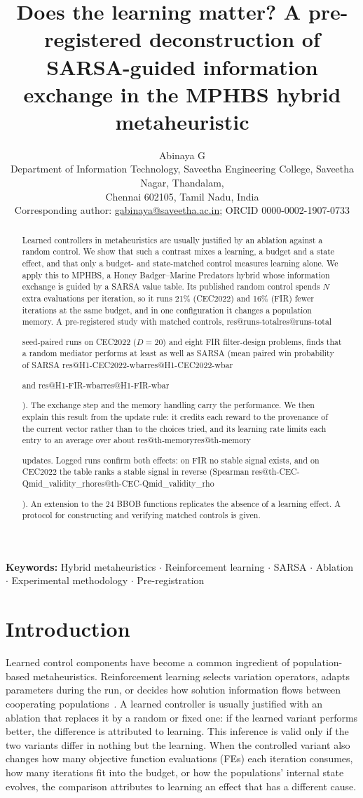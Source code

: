\documentclass[11pt]{article}
\title{Does the learning matter? A pre-registered deconstruction of SARSA-guided information exchange in the MPHBS hybrid metaheuristic}
\author{Abinaya G\\[2pt]
{\small Department of Information Technology, Saveetha Engineering College, Saveetha Nagar, Thandalam,}\\
{\small Chennai 602105, Tamil Nadu, India}\\
{\small Corresponding author: \url{gabinaya@saveetha.ac.in}; ORCID 0000-0002-1907-0733}}
\date{}
\makeatletter
\theoremstyle{definition}
\theoremstyle{remark}
\renewcommand\res[1]{\ifcsname res@#1\endcsname\csname res@#1\endcsname\else\PackageError{res}{Undefined result key #1}{}\fi}
\makeatother
\begin{document}
\maketitle

\begin{abstract}
Learned controllers in metaheuristics are usually justified by an ablation against a random control. We show that
such a contrast mixes a learning, a budget and a state effect, and that only a budget- and state-matched control
measures learning alone. We apply this to MPHBS, a Honey Badger--Marine Predators hybrid whose information exchange is
guided by a SARSA value table. Its published random control spends $N$ extra evaluations per iteration, so it runs 21\%
(CEC2022) and 16\% (FIR) fewer iterations at the same budget, and in one configuration it changes a population memory.
A pre-registered study with matched controls, \res{runs-total} seed-paired runs on CEC2022 ($D=20$) and eight FIR
filter-design problems, finds that a random mediator performs at least as well as SARSA (mean paired win probability of
SARSA \res{H1-CEC2022-wbar} and \res{H1-FIR-wbar}). The exchange step and the memory handling carry the performance. We
then explain this result from the update rule: it credits each reward to the provenance of the current
vector rather than to the choices tried, and its learning rate limits each entry to an average over about
\res{th-memory} updates. Logged runs confirm both effects: on FIR no stable signal exists, and on CEC2022 the table ranks
a stable signal in reverse (Spearman \res{th-CEC-Qmid_validity_rho}). An extension to the 24 BBOB functions replicates
the absence of a learning effect. A protocol for constructing and verifying matched controls is given.
\end{abstract}

\medskip
\noindent\textbf{Keywords:} Hybrid metaheuristics $\cdot$ Reinforcement learning $\cdot$ SARSA $\cdot$ Ablation $\cdot$ Experimental methodology $\cdot$ Pre-registration


\section{Introduction}
\label{sec:intro}

Learned control components have become a common ingredient of population-based metaheuristics. Reinforcement learning
selects variation operators, adapts parameters during the run, or decides how solution information flows between
cooperating populations~\citep{karafotias2015parameter,drugan2019rl}. A learned controller is usually justified with an
ablation that replaces it by a random or fixed one: if the learned variant performs better, the difference is attributed
to learning. This inference is valid only if the two variants differ in nothing but the learning. When the controlled
variant also changes how many objective function evaluations (FEs) each iteration consumes, how many iterations fit into
the budget, or how the populations' internal state evolves, the comparison attributes to learning an effect that has a
different cause.
\end{document}
